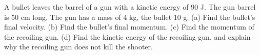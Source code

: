        A bullet leaves the barrel of a gun with a kinetic energy
        of 90 J. The gun barrel is 50 cm long. The gun has a mass of
        4 kg, the bullet 10 g.\hwendpart
        (a) Find the bullet's final velocity. \answercheck\hwendpart
        (b) Find the bullet's final momentum. \answercheck\hwendpart
        (c) Find the momentum of the recoiling gun.\hwendpart
        (d) Find the kinetic energy of the recoiling gun, and
        explain why the recoiling gun does not kill the shooter. \answercheck
